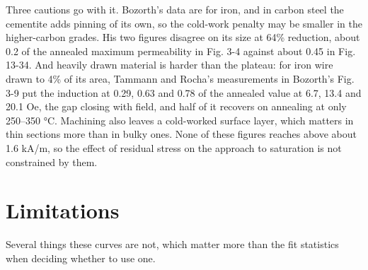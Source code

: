 \documentclass[
  11pt,
]{article}
\begin{document}
Three cautions go with it. Bozorth's data are for iron, and in carbon steel the cementite adds pinning of its own, so the cold-work penalty may be smaller in the higher-carbon grades. His two figures disagree on its size at 64\% reduction, about 0.2 of the annealed maximum permeability in Fig. 3-4 against about 0.45 in Fig. 13-34. And heavily drawn material is harder than the plateau: for iron wire drawn to 4\% of its area, Tammann and Rocha's measurements in Bozorth's Fig. 3-9 put the induction at 0.29, 0.63 and 0.78 of the annealed value at 6.7, 13.4 and 20.1 Oe, the gap closing with field, and half of it recovers on annealing at only 250--350 °C. Machining also leaves a cold-worked surface layer, which matters in thin sections more than in bulky ones. None of these figures reaches above about 1.6 kA/m, so the effect of residual stress on the approach to saturation is not constrained by them.

\section{Limitations}\label{limitations}

Several things these curves are not, which matter more than the fit statistics when deciding whether to use one.
\end{document}

